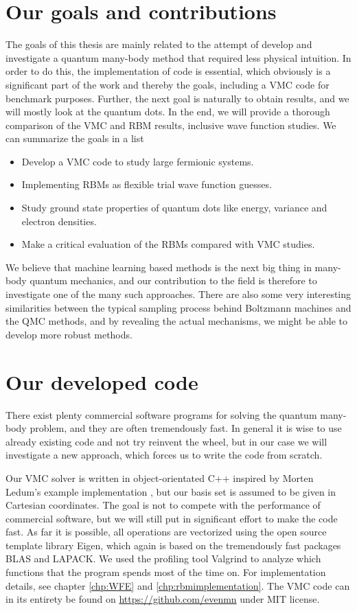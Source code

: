 \section{Our goals and contributions} \label{sec:goals}
The goals of this thesis are mainly related to the attempt of develop and investigate a quantum many-body method that required less physical intuition. In order to do this, the implementation of code is essential, which obviously is a significant part of the work and thereby the goals, including a VMC code for benchmark purposes. Further, the next goal is naturally to obtain results, and we will mostly look at the quantum dots. In the end, we will provide a thorough comparison of the VMC and RBM results, inclusive wave function studies. We can summarize the goals in a list
\begin{itemize}
	\item Develop a VMC code to study large fermionic systems.
	\item Implementing RBMs as flexible trial wave function guesses.
	\item Study ground state properties of quantum dots like energy, variance and electron densities.
	\item Make a critical evaluation of the RBMs compared with VMC studies.
\end{itemize}

We believe that machine learning based methods is the next big thing in many-body quantum mechanics, and our contribution to the field is therefore to investigate one of the many such approaches. There are also some very interesting similarities between the typical sampling process behind Boltzmann machines and the QMC methods, and by revealing the actual mechanisms, we might be able to develop more robust methods. 

\section{Our developed code}
There exist plenty commercial software programs for solving the quantum many-body problem, and they are often tremendously fast. In general it is wise to use already existing code and not try reinvent the wheel, but in our case we will investigate a new approach, which forces us to write the code from scratch. 

Our VMC solver is written in object-orientated C++ inspired by Morten Ledum's example implementation \cite{ledum_simple_2016}, but our basis set is assumed to be given in Cartesian coordinates. The goal is not to compete with the performance of commercial software, but we will still put in significant effort to make the code fast. As far it is possible, all operations are vectorized using the open source template library Eigen, which again is based on the tremendously fast packages BLAS and LAPACK. We used the profiling tool Valgrind to analyze which functions that the program spends most of the time on. For implementation details, see chapter \ref{chp:WFE} and \ref{chp:rbmimplementation}. The VMC code can in its entirety be found on \url{https://github.com/evenmn} under MIT license. 

